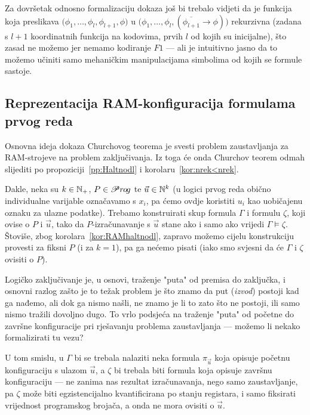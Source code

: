 Za dovršetak odnosno formalizaciju dokaza još bi trebalo vidjeti da je funkcija koja preslikava $\bigl(\phi_1,\dotsc,\phi_l,\phi_{l+1},\phi\bigr)$ u $\bigl(\phi_1,\dotsc,\phi_l,(\overline{\phi_{l+1}}\to\phi)\bigr)$ rekurzivna (zadana s $l+1$ koordinatnih funkcija na kodovima, prvih $l$ od kojih su inicijalne), što zasad ne možemo jer nemamo kodiranje $F1$ --- ali je intuitivno jasno da to možemo učiniti samo mehaničkim manipulacijama simbolima od kojih se formule sastoje.

\subsection{Reprezentacija RAM-konfiguracija formulama prvog reda}

Osnovna ideja dokaza Churchovog teorema je svesti problem zaustavljanja za RAM-strojeve na problem zaključivanja. Iz toga će onda Churchov teorem odmah slijediti po propoziciji~\ref{pp:Haltnodl} i korolaru~\ref{kor:nrek<nrek}.

Dakle, neka su $k\in{\mathbb N}_+$, $P\in\mathscr Pr\mspace{-1mu}o\mspace{-2mu}g$ te $\vec u\in{\mathbb N}^k$ (u logici prvog reda obično individualne varijable označavamo s $x_i$, pa ćemo ovdje koristiti $u_i$ kao uobičajenu oznaku za ulazne podatke). Trebamo konstruirati skup formula $\Gamma$ i formulu $\zeta$, koji ovise o $P$ i $\vec u$, tako da $P$-izračunavanje s $\vec u$ stane ako i samo ako vrijedi $\Gamma\models\zeta$. Štoviše, zbog korolara~\ref{kor:RAMhaltnodl}, zapravo možemo cijelu konstrukciju provesti za fiksni $P$ (i za $k=1$), pa ga nećemo pisati (iako smo svjesni da će $\Gamma$ i $\zeta$ ovisiti o $P$).

Logičko zaključivanje je, u osnovi, traženje "puta" od premisa do zaključka, i osnovni razlog zašto je to težak problem je što znamo da put (\hspace{-1pt}\emph{izvod}) postoji kad ga nađemo, ali dok ga nismo našli, ne znamo je li to zato što ne postoji, ili samo nismo tražili dovoljno dugo. To vrlo podsjeća na traženje "puta" od početne do završne konfiguracije pri rješavanju problema zaustavljanja --- možemo li nekako formalizirati tu vezu?

U tom smislu, u $\Gamma$ bi se trebala nalaziti neka formula $\pi_{\vec u}$ koja opisuje početnu konfiguraciju s ulazom $\vec u$, a $\zeta$ bi trebala biti formula koja opisuje završnu konfiguraciju --- ne zanima nas rezultat izračunavanja, nego samo zaustavljanje, pa $\zeta$ može biti egzistencijalno kvantificirana po stanju registara, i samo fiksirati vrijednost programskog brojača, a onda ne mora ovisiti o $\vec u$.

